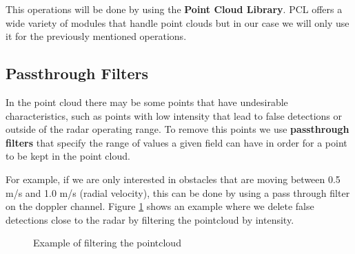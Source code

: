 \documentclass[12pt]{article}
\begin{document}
This operations will be done by using the \textbf{Point Cloud Library}. PCL offers a wide variety of modules that handle point clouds but in our case we will only use it for the previously mentioned operations.
\subsection{Passthrough Filters}
In the point cloud there may be some points that have undesirable characteristics, such as points with low intensity  that lead to false detections or outside of the radar operating range. To remove this points we use \textbf{passthrough filters} that specify the range of values a given field can have in order for a point to be kept in the point cloud. 

For example, if we are only interested in obstacles that are moving between 0.5 m/s and 1.0 m/s (radial velocity), this can be done by using a pass through filter on the doppler channel.
Figure \ref{fig:filters} shows an example where we delete false detections close to the radar by filtering the pointcloud by intensity.
\begin{figure}[h]%
    \centering
    \qquad
    \caption{Example of filtering the pointcloud}%
    \label{fig:filters}
\end{figure}
\end{document}
